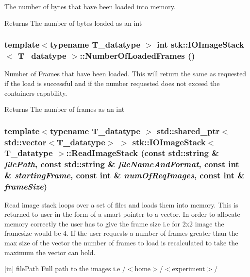\label{classstk_1_1IOImageStack_a25fbe1abf7b60046745581d1e657bb42}
The number of bytes that have been loaded into memory. \begin{DoxyReturn}{Returns}
The number of bytes loaded as an int 
\end{DoxyReturn}
\hypertarget{classstk_1_1IOImageStack_a8b107d1256c2d6c1b77297353c753ae9}{
\subsubsection[{NumberOfLoadedFrames}]{\setlength{\rightskip}{0pt plus 5cm}template$<$typename T\_\-datatype $>$ int {\bf stk::IOImageStack}$<$ T\_\-datatype $>$::NumberOfLoadedFrames ()}}
\label{classstk_1_1IOImageStack_a8b107d1256c2d6c1b77297353c753ae9}
Number of Frames that have been loaded. This will return the same as requested if the load is successful and if the number requested does not exceed the containers capability. \begin{DoxyReturn}{Returns}
The number of frames as an int 
\end{DoxyReturn}
\hypertarget{classstk_1_1IOImageStack_ac66b6ab5e4b061fc6fbed2b98101a0bf}{
\subsubsection[{ReadImageStack}]{\setlength{\rightskip}{0pt plus 5cm}template$<$typename T\_\-datatype $>$ std::shared\_\-ptr$<$ std::vector$<$T\_\-datatype$>$ $>$ {\bf stk::IOImageStack}$<$ T\_\-datatype $>$::ReadImageStack (const std::string \& {\em filePath}, \/  const std::string \& {\em fileNameAndFormat}, \/  const int \& {\em startingFrame}, \/  const int \& {\em numOfReqImages}, \/  const int \& {\em frameSize})}}
\label{classstk_1_1IOImageStack_ac66b6ab5e4b061fc6fbed2b98101a0bf}
Read image stack loops over a set of files and loads them into memory. This is returned to user in the form of a smart pointer to a vector. In order to allocate memory correctly the user has to give the frame size i.e for 2x2 image the framesize would be 4. If the user requests a number of frames greater than the max size of the vector the number of frames to load is recalculated to take the maximum the vector can hold. \begin{DoxyParagraph}{\mbox{[}in\mbox{]} filePath Full path to the images i.e /$<$home$>$/$<$experiment$>$/}

\end{DoxyParagraph}
